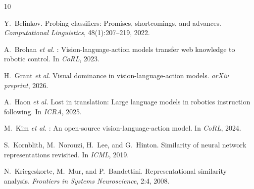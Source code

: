 \documentclass[letterpaper]{article}
\newcommand{\etal}{\textit{et al.}}
\begin{document}
{\small

\begin{thebibliography}{10}

Y.~Belinkov.
\newblock Probing classifiers: Promises, shortcomings, and advances.
\newblock \emph{Computational Linguistics}, 48(1):207--219, 2022.

A.~Brohan \etal
{}: Vision-language-action models transfer web knowledge to robotic control.
\newblock In \emph{CoRL}, 2023.

H.~Grant \etal
\newblock Visual dominance in vision-language-action models.
\newblock \emph{arXiv preprint}, 2026.

A.~Haon \etal
\newblock Lost in translation: Large language models in robotics instruction following.
\newblock In \emph{ICRA}, 2025.

M.~Kim \etal
{}: An open-source vision-language-action model.
\newblock In \emph{CoRL}, 2024.

S.~Kornblith, M.~Norouzi, H.~Lee, and G.~Hinton.
\newblock Similarity of neural network representations revisited.
\newblock In \emph{ICML}, 2019.

N.~Kriegeskorte, M.~Mur, and P.~Bandettini.
\newblock Representational similarity analysis.
\newblock \emph{Frontiers in Systems Neuroscience}, 2:4, 2008.

\end{thebibliography}
}
\end{document}
